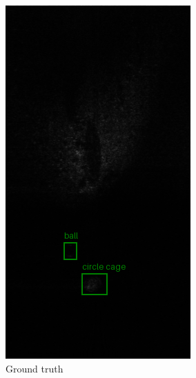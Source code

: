 \documentclass[a0,portrait]{hogent-poster}
\begin{document}
\begin{multicols}{2}
\begin{figure}[H]
    \centering
    \begin{subfigure}{.2\linewidth}
        \centering
        \captionsetup{justification=centering}
        \includegraphics[width=0.9\linewidth]{1_gt.png}
        \caption{Ground truth}
    \end{subfigure}%
    \hfill
    \begin{subfigure}{.2\linewidth}
        \centering
        \captionsetup{justification=centering}

\end{subfigure}
\end{figure}
\end{multicols}
\end{document}
